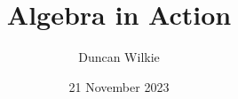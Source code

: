 \documentclass{book}
\title{Algebra in Action}
\author{Duncan Wilkie}
\date{21 November 2023}
\theoremstyle{definition}
\begin{document}
\maketitle





\tableofcontents










\appendix
\noappendicestocpagenum
\addappheadtotoc






\end{document}
